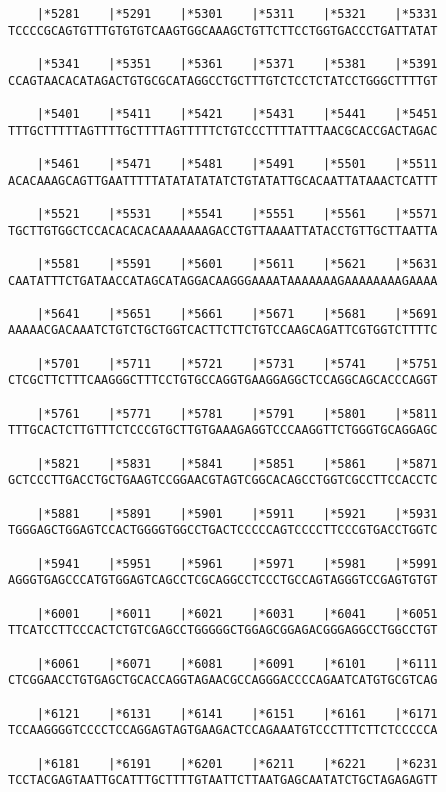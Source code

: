 \documentclass{article}
\begin{document}
\begin{Verbatim}
    |*5281    |*5291    |*5301    |*5311    |*5321    |*5331
TCCCCGCAGTGTTTGTGTGTCAAGTGGCAAAGCTGTTCTTCCTGGTGACCCTGATTATAT
  
    |*5341    |*5351    |*5361    |*5371    |*5381    |*5391
CCAGTAACACATAGACTGTGCGCATAGGCCTGCTTTGTCTCCTCTATCCTGGGCTTTTGT
  
    |*5401    |*5411    |*5421    |*5431    |*5441    |*5451
TTTGCTTTTTAGTTTTGCTTTTAGTTTTTCTGTCCCTTTTATTTAACGCACCGACTAGAC
  
    |*5461    |*5471    |*5481    |*5491    |*5501    |*5511
ACACAAAGCAGTTGAATTTTTATATATATATCTGTATATTGCACAATTATAAACTCATTT
  
    |*5521    |*5531    |*5541    |*5551    |*5561    |*5571
TGCTTGTGGCTCCACACACACAAAAAAAGACCTGTTAAAATTATACCTGTTGCTTAATTA
  
    |*5581    |*5591    |*5601    |*5611    |*5621    |*5631
CAATATTTCTGATAACCATAGCATAGGACAAGGGAAAATAAAAAAAGAAAAAAAAGAAAA
  
    |*5641    |*5651    |*5661    |*5671    |*5681    |*5691
AAAAACGACAAATCTGTCTGCTGGTCACTTCTTCTGTCCAAGCAGATTCGTGGTCTTTTC
  
    |*5701    |*5711    |*5721    |*5731    |*5741    |*5751
CTCGCTTCTTTCAAGGGCTTTCCTGTGCCAGGTGAAGGAGGCTCCAGGCAGCACCCAGGT
  
    |*5761    |*5771    |*5781    |*5791    |*5801    |*5811
TTTGCACTCTTGTTTCTCCCGTGCTTGTGAAAGAGGTCCCAAGGTTCTGGGTGCAGGAGC
  
    |*5821    |*5831    |*5841    |*5851    |*5861    |*5871
GCTCCCTTGACCTGCTGAAGTCCGGAACGTAGTCGGCACAGCCTGGTCGCCTTCCACCTC
  
    |*5881    |*5891    |*5901    |*5911    |*5921    |*5931
TGGGAGCTGGAGTCCACTGGGGTGGCCTGACTCCCCCAGTCCCCTTCCCGTGACCTGGTC
  
    |*5941    |*5951    |*5961    |*5971    |*5981    |*5991
AGGGTGAGCCCATGTGGAGTCAGCCTCGCAGGCCTCCCTGCCAGTAGGGTCCGAGTGTGT
  
    |*6001    |*6011    |*6021    |*6031    |*6041    |*6051
TTCATCCTTCCCACTCTGTCGAGCCTGGGGGCTGGAGCGGAGACGGGAGGCCTGGCCTGT
  
    |*6061    |*6071    |*6081    |*6091    |*6101    |*6111
CTCGGAACCTGTGAGCTGCACCAGGTAGAACGCCAGGGACCCCAGAATCATGTGCGTCAG
  
    |*6121    |*6131    |*6141    |*6151    |*6161    |*6171
TCCAAGGGGTCCCCTCCAGGAGTAGTGAAGACTCCAGAAATGTCCCTTTCTTCTCCCCCA
  
    |*6181    |*6191    |*6201    |*6211    |*6221    |*6231
TCCTACGAGTAATTGCATTTGCTTTTGTAATTCTTAATGAGCAATATCTGCTAGAGAGTT
  

\end{Verbatim}
\end{document}
